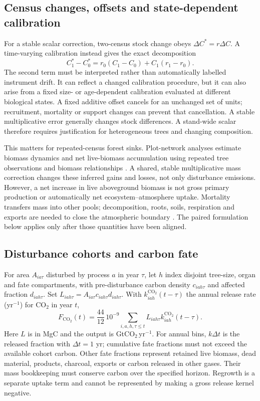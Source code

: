 \documentclass[11pt,a4paper]{article}
\newcommand{\COtwo}{\ensuremath{\mathrm{CO}_2}}
\theoremstyle{remark}
\begin{document}
\subsection{Census changes, offsets and state-dependent calibration}
For a stable scalar correction, two-census stock change obeys $\Delta C^*=r\Delta C$. A time-varying calibration instead gives the exact decomposition
\begin{equation}
C_1^*-C_0^*=r_0(C_1-C_0)+C_1(r_1-r_0).
\label{eq:census}
\end{equation}
The second term must be interpreted rather than automatically labelled instrument drift. It can reflect a changed calibration procedure, but it can also arise from a fixed size- or age-dependent calibration evaluated at different biological states. A fixed additive offset cancels for an unchanged set of units; recruitment, mortality or support changes can prevent that cancellation. A stable multiplicative error generally changes stock differences. A stand-wide scalar therefore requires justification for heterogeneous trees and changing composition.

This matters for repeated-census forest sinks. Plot-network analyses estimate biomass dynamics and net live-biomass accumulation using repeated tree observations and biomass relationships \citep{Brienen2015}. A shared, stable multiplicative mass correction changes these inferred gains and losses, not only disturbance emissions. However, a net increase in live aboveground biomass is not gross primary production or automatically net ecosystem--atmosphere uptake. Mortality transfers mass into other pools; decomposition, roots, soils, respiration and exports are needed to close the atmospheric boundary \citep{IPCC2006}. The paired formulation below applies only after those quantities have been aligned.

\subsection{Disturbance cohorts and carbon fate}
For area $A_{ia\tau}$ disturbed by process $a$ in year $\tau$, let $h$ index disjoint tree-size, organ and fate compartments, with pre-disturbance carbon density $c_{iah\tau}$ and affected fraction $d_{iah\tau}$. Set $L_{iah\tau}=A_{ia\tau}c_{iah\tau}d_{iah\tau}$. With $k^{\COtwo}_{iah}(t-\tau)$ the annual release rate (yr$^{-1}$) for \COtwo{} in year $t$,
\begin{equation}
F_{\COtwo}(t)=\frac{44}{12}\,10^{-9}
 \sum_{i,a,h,\tau\leq t}L_{iah\tau}k^{\COtwo}_{iah}(t-\tau).
\label{eq:cohort}
\end{equation}
Here $L$ is in MgC and the output is Gt\COtwo{}\,yr$^{-1}$. For annual bins, $k\Delta t$ is the released fraction with $\Delta t=1$ yr; cumulative fate fractions must not exceed the available cohort carbon. Other fate fractions represent retained live biomass, dead material, products, charcoal, exports or carbon released in other gases. Their mass bookkeeping must conserve carbon over the specified horizon. Regrowth is a separate uptake term and cannot be represented by making a gross release kernel negative.
\end{document}
